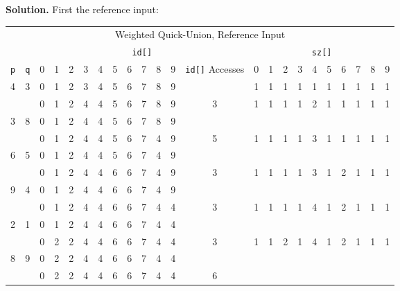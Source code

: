 \documentclass[12pt, a4paper]{article}
\newenvironment{sol}[1][Solution]
{\par\medskip\noindent \textbf{#1.} }
{\medskip}
\begin{document}
	\begin{sol}
		First the reference input:
		\begin{center}
			\begin{tabular}{cc|cccccccccc|c|cccccccccc}
				\multicolumn{23}{c}{Weighted Quick-Union, Reference Input}\\
				{} & {} & \multicolumn{11}{c}{\texttt{id[]}} & \multicolumn{10}{c}{\texttt{sz[]}}\\
				\texttt{p} & \texttt{q} & 0 & 1 & 2 & 3 & 4 & 5 & 6 & 7 & 8 & 9 & \texttt{id[]} Accesses
				& 0 & 1 & 2 & 3 & 4 & 5 & 6 & 7 & 8 & 9\\
				\hline
				4  & 3  & 0 & 1 & 2 & {\color{green} 3} & {\color{green}4} & 5 & 6 & 7 & 8 & 9 & {} &
				1 & 1 & 1 & 1 & 1 & 1 & 1 & 1 & 1 & 1\\
				{} & {} & 0 & 1 & 2 & {\color{red}4} & 4 & 5 & 6 & 7 & 8 & 9 & 3 &
				1 & 1 & 1 & 1 & 2 & 1 & 1 & 1 & 1 & 1\\
				
				3  & 8  & 0 & 1 & 2 & {\color{green}4} & {\color{green}4} & 5 & 6 & 7 & {\color{green}8} & 9 & {}
				\\
				{} & {} & 0 & 1 & 2 & 4 & 4 & 5 & 6 & 7 & {\color{red}4} & 9 & 5
				& 1 & 1 & 1 & 1 & 3 & 1 & 1& 1  & 1 & 1\\
				
				6  & 5  & 0 & 1 & 2 & 4 & 4 & {\color{green}5} & {\color{green}6} & 7 & 4 & 9 & {}
				\\
				{} & {} & 0 & 1 & 2 & 4 & 4 & {\color{red}6} & 6 & 7 & 4 & 9 & 3
				& 1 & 1 & 1 & 1 & 3 & 1 & 2& 1  & 1 & 1\\
				
				9  & 4  & 0 & 1 & 2 & {\color{green}4} & {\color{green}4} & 6 & 6 & 7 & {\color{green}4} & {\color{green}9} & {}
				\\
				{} & {} & 0 & 1 & 2 & 4 & 4 & 6 & 6 & 7 & 4 & {\color{red}4} & 3
				& 1 & 1 & 1 & 1 & 4 & 1 & 2& 1  & 1 & 1\\
				
				2  & 1  & 0 & {\color{green}1} & {\color{green}2} & 4 & 4 & 6 & 6 & 7 & 4 & 4 & {}
				\\
				{} & {} & 0 & {\color{red}2}   & 2 & 4 & 4 & 6 & 6 & 7 & 4 & 4 & 3
				& 1 & 1 & 2 & 1 & 4 & 1 & 2& 1  & 1 & 1\\
				
				8  & 9  & 0 & 2  & 2 & 4 & 4 & 6 & 6 & 7 & 4 & 4 & {}\\
				{} & {} & 0 & 2  & 2 & 4 & 4 & 6 & 6 & 7 & 4 & 4 & 6
				\\
				

\end{tabular}
\end{center}
\end{sol}
\end{document}
